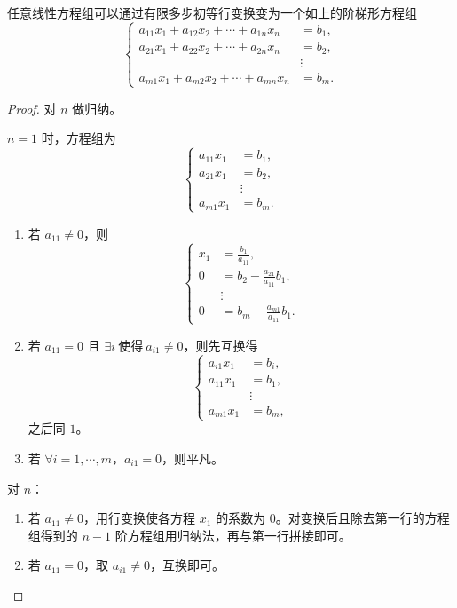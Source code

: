 \begin{lemma}\label{任意线性方程组可以通过有限多步初等行变换变为一个如上的阶梯形方程组}
	任意线性方程组可以通过有限多步初等行变换变为一个如上的阶梯形方程组
	\[
	\left\{
	\begin{aligned}
		a_{11}x_1+a_{12}x_2+\cdots+a_{1n}x_n&=b_1,\\
		a_{21}x_1+a_{22}x_2+\cdots+a_{2n}x_n&=b_2,\\
		&\vdots\\
		a_{m1}x_1+a_{m2}x_2+\cdots+a_{mn}x_n&=b_m.
	\end{aligned}
	\right.
	\]
\end{lemma}
\begin{proof}
	对 $n$ 做归纳。
	
	$n=1$ 时，方程组为
	\[
	\left\{
	\begin{aligned}
		a_{11}x_1&=b_1,\\
		a_{21}x_1&=b_2,\\
		&\vdots\\
		a_{m1}x_1&=b_m.
	\end{aligned}
	\right.
	\]
	\begin{enumerate}
		\item 若 $a_{11}\neq0$，则
		\[
		\left\{
		\begin{aligned}
			x_1&=\frac{b_1}{a_{11}},\\
			0&=b_2-\frac{a_{21}}{a_{11}}b_1,\\
			&\vdots\\
			0&=b_m-\frac{a_{m1}}{a_{11}}b_1.
		\end{aligned}
		\right.
		\]
		\item 若 $a_{11}=0$ 且 $\exists i\ \text{使得}\ a_{i1}\neq0$，则先互换得
		\[
		\left\{
		\begin{aligned}
			a_{i1}x_1&=b_i,\\
			a_{11}x_1&=b_1,\\
			&\vdots\\
			a_{m1}x_1&=b_m,
		\end{aligned}
		\right.
		\]
		之后同 $1$。
		\item 若 $\forall i=1,\cdots,m$，$a_{i1}=0$，则平凡。
	\end{enumerate}
	
	对 $n$：
	\begin{enumerate}
		\item 若 $a_{11}\neq0$，用行变换使各方程 $x_1$ 的系数为 $0$。对变换后且除去第一行的方程组得到的 $n-1$ 阶方程组用归纳法，再与第一行拼接即可。
		\item 若 $a_{11}=0$，取 $a_{i1}\neq0$，互换即可。
	\end{enumerate}
\end{proof}

